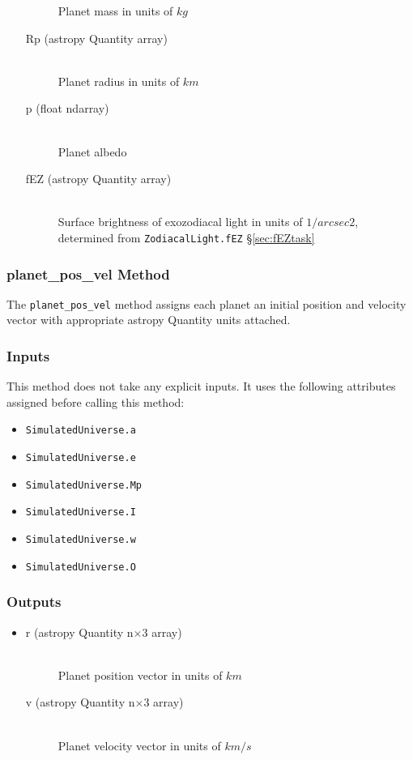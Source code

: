 \documentclass[cleanfoot]{asme2ej}
\begin{document}
\begin{itemize}
\begin{description}
            Planet mass in units of $ kg $
        \item[Rp (astropy Quantity array)] \hfill \\
            Planet radius in units of $ km $
        \item[p (float ndarray)] \hfill \\
            Planet albedo
        \item[fEZ (astropy Quantity array)] \hfill \\
            Surface brightness of exozodiacal light in units of $ 1/arcsec2 $, determined from \verb+ZodiacalLight.fEZ+ \S\ref{sec:fEZtask}
    \end{description}
\end{itemize}

\subsubsection{planet\_pos\_vel Method} \label{sec:planetposveltask}
The \verb+planet_pos_vel+ method assigns each planet an initial position and velocity vector with appropriate astropy Quantity units attached.

\subsubsection*{Inputs}
This method does not take any explicit inputs.  It uses the following attributes assigned before calling this method:
\begin{itemize}
    \item \verb+SimulatedUniverse.a+
    \item \verb+SimulatedUniverse.e+
    \item \verb+SimulatedUniverse.Mp+
    \item \verb+SimulatedUniverse.I+
    \item \verb+SimulatedUniverse.w+
    \item \verb+SimulatedUniverse.O+
\end{itemize}
\subsubsection*{Outputs}
\begin{itemize}
    \item 
    \begin{description}
        \item[r (astropy Quantity n$\times$3 array)] \hfill \\ Planet position vector in units of $ km $
        \item[v (astropy Quantity n$\times$3 array)] \hfill \\ Planet velocity vector in units of $ km/s $
    \end{description}
\end{itemize}
\end{document}
